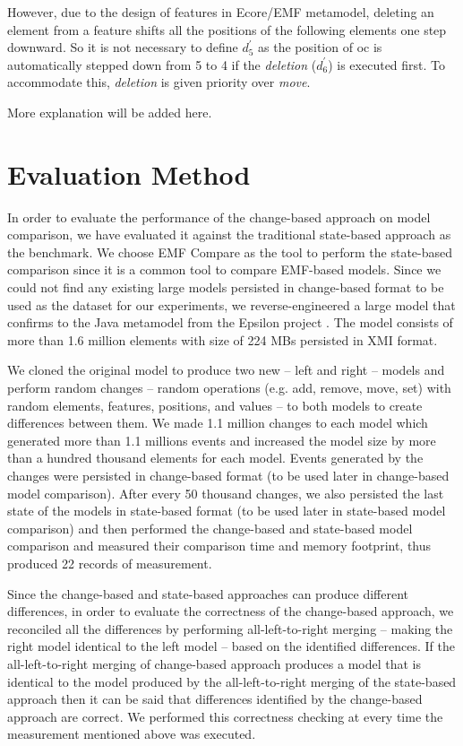 \documentclass{llncs}
\begin{document}
However, due to the design of features in Ecore/EMF metamodel, deleting an element from a feature shifts all the positions of the following elements one step downward. So it is not necessary to define $d_5^\prime$ as the position of \textsf{oc} is automatically stepped down from 5 to 4 if the \textit{deletion} ($d_6^\prime$) is executed first. To accommodate this, \textit{deletion} is given priority over \textit{move}. 

More explanation will be added here.

\section{Evaluation Method}
\label{sec:evaluation}

In order to evaluate the performance of the change-based approach on model comparison, we have evaluated it against the traditional state-based approach as the benchmark. We choose EMF Compare \cite{emfcompare2018developer,eclipse2017compare} as the tool to perform the state-based comparison since it is a common tool to compare EMF-based models. Since we could not find any existing large models persisted in change-based format to be used as the dataset for our experiments, we reverse-engineered a large model that confirms to the Java metamodel \cite{eclipse2018modiscojava} from the Epsilon project \cite{eclipse2018epsilongit,eclipse2017epsilon}. The model consists of more than 1.6 million elements with size of 224 MBs persisted in XMI format. 

We cloned the original model to produce two new -- left and right -- models and perform random changes -- random operations (e.g. add, remove, move, set) with random elements, features, positions, and values -- to both models to create differences between them. We made 1.1 million changes to each model which generated more than 1.1 millions events and increased the model size by more than a hundred thousand elements for each model. Events generated by the changes were persisted in change-based format (to be used later in change-based model comparison). After every 50 thousand changes, we also persisted the last state of the models in state-based format (to be used later in state-based model comparison) and then performed the change-based and state-based model comparison and measured their comparison time and memory footprint, thus produced 22 records of measurement. 

Since the change-based and state-based approaches can produce different differences, in order to evaluate the correctness of the change-based approach, we reconciled all the differences by performing all-left-to-right merging -- making the right model identical to the left model -- based on the identified differences. If the all-left-to-right merging of change-based approach produces a model that is identical to the model produced by the all-left-to-right merging of the state-based approach then it can be said that differences identified by the change-based approach are correct. We performed this correctness checking at every time the measurement mentioned above was executed.
\end{document}
